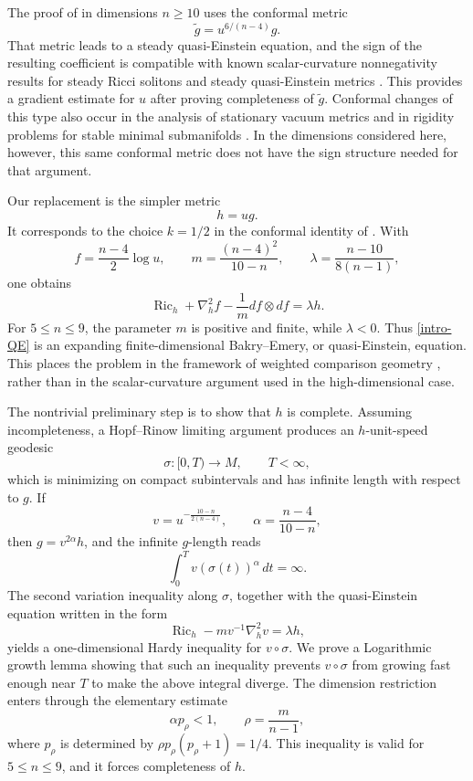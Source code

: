 \documentclass[11pt]{amsart}
\numberwithin{equation}{section}
\DeclareMathOperator{\Ric}{Ric}
\newcommand{\Hess}{\nabla^2}
\begin{document}
The proof of \cite{CMM2026} in dimensions $n\ge10$ uses the conformal metric
$$
        \widetilde g=u^{6/(n-4)}g .
$$
That metric leads to a steady quasi-Einstein equation, and the sign of the resulting coefficient is compatible with known scalar-curvature nonnegativity results for steady Ricci solitons and steady quasi-Einstein metrics \cite{Chen2009,Wang2011}.  This provides a gradient estimate for $u$ after proving completeness of $\widetilde g$.  Conformal changes of this type also occur in the analysis of stationary vacuum metrics and in rigidity problems for stable minimal submanifolds \cite{Anderson2000,FischerColbrie,CMR2024,MagliaroMariRoingSavas2024}.  In the dimensions considered here, however, this same conformal metric does not have the sign structure needed for that argument.

Our replacement is the simpler metric
\begin{equation}\label{intro-hdef}
        h=ug .
\end{equation}
It corresponds to the choice $k=1/2$ in the conformal identity of \cite[Proposition~2.1]{CMM2026}.  With
$$
        f=\frac{n-4}{2}\log u,
        \qquad
        m=\frac{(n-4)^2}{10-n},
        \qquad
        \lambda=\frac{n-10}{8(n-1)},
$$
one obtains
\begin{equation}\label{intro-QE}
        \Ric_h+\Hess_h f-\frac1m df\otimes df=\lambda h .
\end{equation}
For $5\le n\le9$, the parameter $m$ is positive and finite, while $\lambda<0$.  Thus \eqref{intro-QE} is an expanding finite-dimensional Bakry--Emery, or quasi-Einstein, equation.  This places the problem in the framework of weighted comparison geometry \cite{BakryEmery,CaseShuWei,HePetersenWylie,Qian,WeiWylie}, rather than in the scalar-curvature argument used in the high-dimensional case.

The nontrivial preliminary step is to show that $h$ is complete.  Assuming incompleteness, a Hopf--Rinow limiting argument produces an $h$-unit-speed geodesic
$$
        \sigma:[0,T)\to M,
        \qquad T<\infty,
$$
which is minimizing on compact subintervals and has infinite length with respect to $g$.  If
$$
        v=u^{-\frac{10-n}{2(n-4)}},
        \qquad
        \alpha=\frac{n-4}{10-n},
$$
then $g=v^{2\alpha}h$, and the infinite $g$-length reads
$$
        \int_0^T v(\sigma(t))^\alpha\,dt=\infty .
$$
The second variation inequality along $\sigma$, together with the quasi-Einstein equation written in the form
$$
        \Ric_h-mv^{-1}\Hess_h v=\lambda h,
$$
yields a one-dimensional Hardy inequality for $v\circ\sigma$.  We prove a Logarithmic growth lemma showing that such an inequality prevents $v\circ\sigma$ from growing fast enough near $T$ to make the above integral diverge.  The dimension restriction enters through the elementary estimate
$$
        \alpha p_\rho<1,
        \qquad
        \rho=\frac{m}{n-1},
$$
where $p_\rho$ is determined by $\rho p_\rho(p_\rho+1)=1/4$.  This inequality is valid for $5\le n\le9$, and it forces completeness of $h$.
\end{document}
